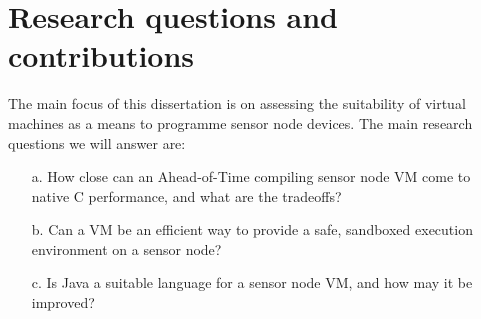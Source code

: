 \section{Research questions and contributions}
\label{sec-introduction-research-questions}
The main focus of this dissertation is on assessing the suitability of virtual machines as a means to programme sensor node devices. The main research questions we will answer are:
\begin{enumerate}
    \item[a.] How close can an Ahead-of-Time compiling sensor node VM come to native C performance, and what are the tradeoffs?
    \item[b.] Can a VM be an efficient way to provide a safe, sandboxed execution environment on a sensor node?
    \item[c.] Is Java a suitable language for a sensor node VM, and how may it be improved?
\end{enumerate}


